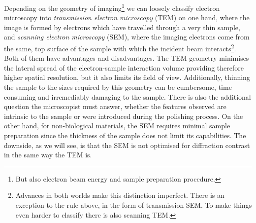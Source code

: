 Depending on the geometry of imaging\footnote{ But also electron beam energy and sample preparation procedure.} we can loosely classify electron microscopy into \textit{transmission electron microscopy} (TEM) on one hand, where the image is formed by electrons which have travelled through a very thin sample, and \textit{scanning electron microscopy} (SEM), where the imaging electrons come from the same, top surface of the sample with which the incident beam interacts\footnote{ Advances in both worlds make this distinction imperfect. There is an exception to the rule above, in the form of transmission SEM. To make things even harder to classify there is also scanning TEM.}. Both of them have advantages and disadvantages. The TEM geometry minimises the lateral spread of the electron-sample interaction volume providing therefore higher spatial resolution, but it also limits its field of view. Additionally, thinning the sample to the sizes required by this geometry can be cumbersome, time consuming and irremediably damaging to the sample. There is also the additional question the microscopist must answer, whether the features observed are intrinsic to the sample or were introduced during the polishing process. On the other hand, for non-biological materials, the SEM requires minimal sample preparation since the thickness of the sample does not limit its capabilities. The downside, as we will see, is that the SEM is not optimised for diffraction contrast in the same way the TEM is. 


